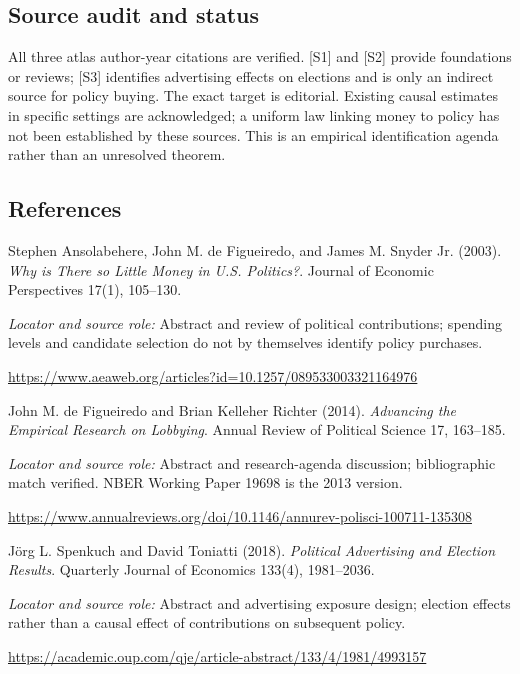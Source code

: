 \documentclass[11pt,a4paper]{article}
\begin{document}
\subsection*{Source audit and status}
All three atlas author-year citations are verified. [S1] and [S2] provide foundations or reviews; [S3] identifies advertising effects on elections and is only an indirect source for policy buying. The exact target is editorial. Existing causal estimates in specific settings are acknowledged; a uniform law linking money to policy has not been established by these sources. This is an empirical identification agenda rather than an unresolved theorem.
\subsection*{References}
{\footnotesize\raggedright
\begin{enumerate}[label={\textbf{[S\arabic*]}},leftmargin=3em]
\item Stephen Ansolabehere, John M. de Figueiredo, and James M. Snyder Jr. (2003). \emph{Why is There so Little Money in U.S. Politics?}. Journal of Economic Perspectives 17(1), 105--130.\par
\textit{Locator and source role:} Abstract and review of political contributions; spending levels and candidate selection do not by themselves identify policy purchases.\par
\url{https://www.aeaweb.org/articles?id=10.1257/089533003321164976}
\item John M. de Figueiredo and Brian Kelleher Richter (2014). \emph{Advancing the Empirical Research on Lobbying}. Annual Review of Political Science 17, 163--185.\par
\textit{Locator and source role:} Abstract and research-agenda discussion; bibliographic match verified. NBER Working Paper 19698 is the 2013 version.\par
\url{https://www.annualreviews.org/doi/10.1146/annurev-polisci-100711-135308}
\item Jörg L. Spenkuch and David Toniatti (2018). \emph{Political Advertising and Election Results}. Quarterly Journal of Economics 133(4), 1981--2036.\par
\textit{Locator and source role:} Abstract and advertising exposure design; election effects rather than a causal effect of contributions on subsequent policy.\par
\url{https://academic.oup.com/qje/article-abstract/133/4/1981/4993157}
\end{enumerate}
}
\end{document}
